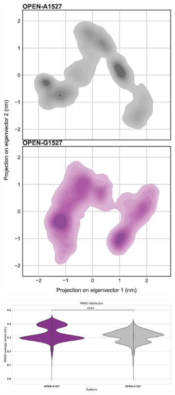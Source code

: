 \begin{figure}[H]
\begin{subfigure}[t]{.25\textwidth}
        \includegraphics[width=\textwidth]{./extended_plots/rmsd_projection_open.png}        
    \end{subfigure}
    \hspace{1cm}
    \begin{subfigure}[t]{.5\textwidth}
        \caption{}
        \includegraphics[width=\textwidth]{./extended_plots/rmsd_volcano.png}        

\end{subfigure}
\end{figure}
